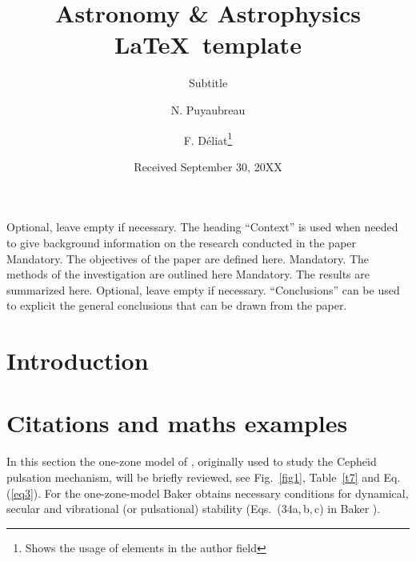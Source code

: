 \documentclass{aa}
\begin{document}
   \title{Astronomy \& Astrophysics \LaTeX\ template}

   \subtitle{Subtitle}

   \author{N. Puyaubreau
        \and F. Déliat\fnmsep\thanks{Shows the usage of elements in the author field}
        }


   \date{Received September 30, 20XX}

 
  \abstract
   {Optional, leave empty if necessary.  The heading “Context” is used when needed to
give background information on the research conducted in the paper}
   {Mandatory. The objectives of the paper are defined here.} 
   {Mandatory. The methods of the investigation are outlined here}
   {Mandatory. The results are summarized here.}
   {Optional, leave empty if necessary.  “Conclusions” can be used to
explicit the general conclusions that can be drawn from the paper.}


   \maketitle


\section{Introduction}
\lipsum[1]
\section{Citations and maths examples}

   In this section the one-zone model of \citet{baker},
   originally used to study the Cephe{\"{\i}}d pulsation mechanism, will
   be briefly reviewed, see Fig.~\ref{fig1}, Table~\ref{t7} and Eq. (\ref{eq3}).
   For the one-zone-model Baker obtains necessary conditions
   for dynamical, secular and vibrational (or pulsational)
   stability (Eqs.\ (34a,\,b,\,c) in Baker \citeyear{baker}).
   
\end{document}
